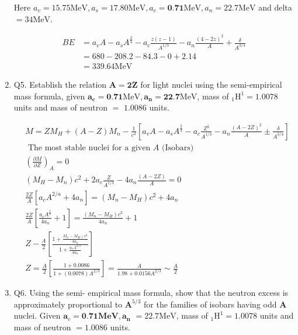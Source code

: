 \begin{enumerate}
Here $a_v=15.75 \mathrm{MeV}, a_s=17.80 \mathrm{MeV}, a_c=\mathbf{0 . 7 1} \mathrm{MeV}, a_n=22.7 \mathrm{MeV}$ and delta $=34 \mathrm{MeV}$.
\begin{answer}
	\begin{align*}
	B E&=a_v A-a_s A^{\frac{2}{3}}-a_{c} \frac{z(z-1)}{A^{1/3}}-a_n \frac{(4-2 z)^2}{A}+\frac{\delta}{A^{3 / 4}}\\
	&=680-208.2-84.3-0+2.14 \\
	&=339.64 \mathrm{MeV}
	\end{align*}
\end{answer}
\item Q5. Establish the relation $\mathbf{A}=\mathbf{2} \mathbf{Z}$ for light nuclei using the semi-empirical mass formula, given $\boldsymbol{a}_{\boldsymbol{c}}=\mathbf{0 . 7 1} \mathrm{MeV}, \boldsymbol{a}_{\boldsymbol{n}}=\mathbf{2 2 . 7} \mathrm{MeV}$, mass of ${ }_1 \mathrm{H}^1=1.0078$ units and mass of neutron $=$ $1.0086$ units.
\begin{answer}
	\begin{align*}
	&M=Z M_H+(A-Z) M_n-\frac{1}{c^2}\left[a_v A-a_s A^{\frac{2}{3}}-a_{c} \frac{Z^2}{A^{1/3}}-a_n \frac{(A-2 Z)^2}{A} \pm \frac{\delta}{A^{3/4}}\right]\\
&\text{	The most stable nuclei for a given $A$ (Isobars)}\\
	&\left(\frac{\partial M}{\partial Z}\right)_A=0\\
	&\left(M_H-M_n\right) c^2+2 a_{c} \frac{Z}{A^{1/3}}-4 a_n \frac{\left(A-2 Z\right)}{A}=0\\
	&\frac{2 Z}{A}\left[a_{c} A^{2/a}+4 a_n\right]=\left(M_n-M_H\right) c^2+4 a_n\\
	&\frac{2 Z}{A}\left[\frac{a_c A^{\frac{2}{3}}}{4 a_n}+1\right]=\frac{\left(M_n-M_H\right) c^2}{4 a_n}+1\\
	&Z-\frac{A}{2}\left[\frac{1+\frac{\left.M_n-M_H\right) c^2}{4 a_n}}{1+\frac{a_cA^{2/3}}{4 a_n}}\right]\\
	&Z=\frac{A}{2}\left[\frac{1+0.0086}{1+(0.0078) A^{2 / 3}}\right]=\frac{A}{1.98+0.0156 A^{2 / 3}} \sim \frac{A}{2}
	\end{align*}
\end{answer}
\item Q6. Using the semi- empirical mass formula, show that the neutron excess is approximately proportional to $\mathbf{A}^{5 / 3}$ for the families of isobars having odd $\mathbf{A}$ nuclei. Given $\boldsymbol{a}_c=\mathbf{0 . 7 1} \mathbf{M e V}, \boldsymbol{a}_{\boldsymbol{n}}$ $=22.7 \mathrm{MeV}$, mass of ${ }_1 \mathrm{H}^1=1.0078$ units and mass of neutron $=1.0086$ units.

\end{enumerate}
